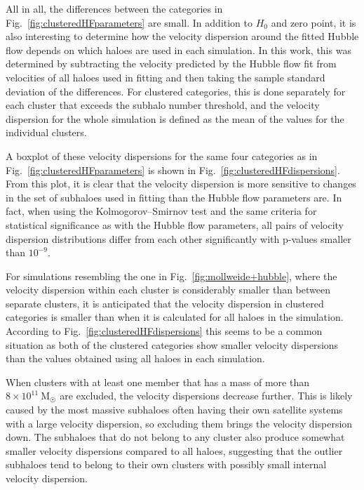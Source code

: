 \documentclass[english, oneside]{HYgradu}
\begin{document}
All in all, the differences between the categories in Fig.~\ref{fig:clusteredHFparameters} are small. In addition to $H_0$ and zero point, it is also interesting to determine how the velocity dispersion around the fitted Hubble flow depends on which haloes are used in each simulation. In this work, this was determined by subtracting the velocity predicted by the Hubble flow fit from velocities of all haloes used in fitting and then taking the sample standard deviation of the differences. For clustered categories, this is done separately for each cluster that exceeds the subhalo number threshold, and the velocity dispersion for the whole simulation is defined as the mean of the values for the individual clusters.

A boxplot of these velocity dispersions for the same four categories as in Fig.~\ref{fig:clusteredHFparameters} is shown in Fig.~\ref{fig:clusteredHFdispersions}. From this plot, it is clear that the velocity dispersion is more sensitive to changes in the set of subhaloes used in fitting than the Hubble flow parameters are. In fact, when using the Kolmogorov--Smirnov test and the same criteria for statistical significance as with the Hubble flow parameters, all pairs of velocity dispersion distributions differ from each other significantly with p-values smaller than $10^{-9}$.

For simulations resembling the one in Fig.~\ref{fig:mollweide+hubble}, where the velocity dispersion within each cluster is considerably smaller than between separate clusters, it is anticipated that the velocity dispersion in clustered categories is smaller than when it is calculated for all haloes in the simulation. According to Fig.~\ref{fig:clusteredHFdispersions} this seems to be a common situation as both of the clustered categories show smaller velocity dispersions than the values obtained using all haloes in each simulation.

When clusters with at least one member that has a mass of more than \mbox{$8 \times 10^{11}~\mathrm{M}_{\astrosun}$} are excluded, the velocity dispersions decrease further. This is likely caused by the most massive subhaloes often having their own satellite systems with a large velocity dispersion, so excluding them brings the velocity dispersion down. The subhaloes that do not belong to any cluster also produce somewhat smaller velocity dispersions compared to all haloes, suggesting that the outlier subhaloes tend to belong to their own clusters with possibly small internal velocity dispersion.
\end{document}

